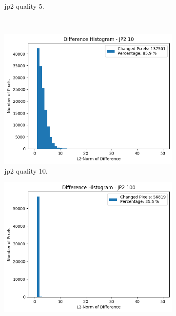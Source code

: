 \begin{figure}[htb]
\begin{subfigure}[b]{0.49\textwidth}
            \caption{\gls{jp2} quality 5.}
            \label{fig:img_quality_center_histogram_5}
        \end{subfigure}
        \\
        \begin{subfigure}[b]{0.49\textwidth}
            \centering
            \includegraphics[width=\textwidth]{doc/thesis/0_figures/compare_quality/set1/jp2_10_center_diff_histogram.png}
            \caption{\gls{jp2} quality 10.}
            \label{fig:img_quality_center_histogram_10}
        \end{subfigure}
        \begin{subfigure}[b]{0.49\textwidth}
            \centering
            \includegraphics[width=\textwidth]{doc/thesis/0_figures/compare_quality/set1/jp2_100_center_diff_histogram.png}

\end{subfigure}
\end{figure}
